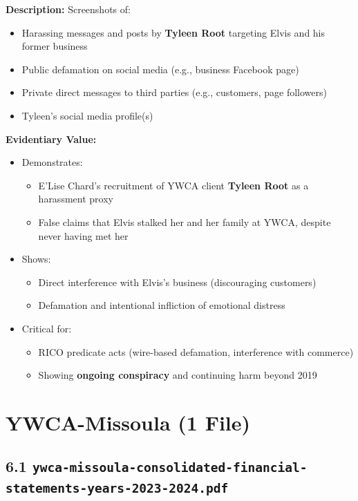 \documentclass[11pt, letterpaper]{article}
\begin{document}
\textbf{Description:} Screenshots of:

\begin{itemize}[leftmargin=*]
  \item Harassing messages and posts by \textbf{Tyleen Root} targeting Elvis and his former business
  \item Public defamation on social media (e.g., business Facebook page)
  \item Private direct messages to third parties (e.g., customers, page followers)
  \item Tyleen's social media profile(s)
\end{itemize}

\textbf{Evidentiary Value:}

\begin{itemize}[leftmargin=*]
  \item Demonstrates:
    \begin{itemize}
      \item E'Lise Chard's recruitment of YWCA client \textbf{Tyleen Root} as a harassment proxy
      \item False claims that Elvis stalked her and her family at YWCA, despite never having met her
    \end{itemize}
  \item Shows:
    \begin{itemize}
      \item Direct interference with Elvis's business (discouraging customers)
      \item Defamation and intentional infliction of emotional distress
    \end{itemize}
  \item Critical for:
    \begin{itemize}
      \item RICO predicate acts (wire-based defamation, interference with commerce)
      \item Showing \textbf{ongoing conspiracy} and continuing harm beyond 2019
    \end{itemize}
\end{itemize}

\newpage

\section{YWCA-Missoula (1 File)}

\subsection{6.1 \texttt{ywca-missoula-consolidated-financial-statements-years-2023-2024.pdf}}
\end{document}
